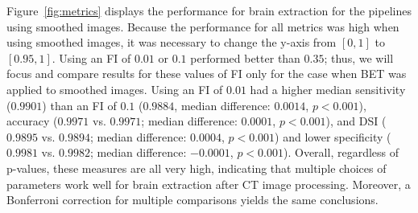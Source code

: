 \documentclass{elsarticle}\usepackage[]{graphicx}\usepackage[]{color}
\begin{document}
Figure~\ref{fig:metrics}\protect{} displays the performance for brain extraction for the pipelines using smoothed images.   Because the performance for all metrics was high when using smoothed images, it was necessary to change the y-axis from $[0,1]$ to $[0.95,1]$. 
Using an FI of $0.01$ or $0.1$ performed better than $0.35$; thus, we will focus and compare results for these values of FI only for the case when BET was applied to smoothed images.  Using an FI of $0.01$ had a higher median sensitivity ($0.9901$) than an FI of $0.1$ ($0.9884$, median difference: $0.0014$, $p< 0.001$), accuracy ($0.9971$ vs. $0.9971$; median difference: $0.0001$, $p< 0.001$), and DSI ($0.9895$ vs. $0.9894$; median difference: $0.0004$, $p< 0.001$) and lower specificity ($0.9981$ vs. $0.9982$; median difference: $-0.0001$, $p< 0.001$).  Overall, regardless of p-values, these measures are all very high, indicating that multiple choices of parameters work well for brain extraction after CT image processing.  Moreover, a Bonferroni correction for multiple comparisons yields the same conclusions. 

% 
% 
\end{document}

